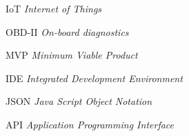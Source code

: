 \begin{basedescript}{\desclabelstyle{\pushlabel}\desclabelwidth{6em}}
\item[{IoT}] \textit{Internet of Things}
\item[{OBD-II}] \textit{On-board diagnostics}
\item[{MVP}] \textit{Minimum Viable Product}
\item[{IDE}] \textit{Integrated Development Environment}
\item[{JSON}] \textit{Java Script Object Notation}
\item[{API}] \textit{Application Programming Interface}
\end{basedescript}